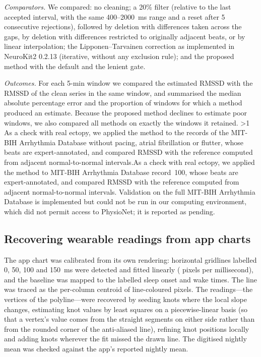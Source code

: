 \documentclass[11pt,a4paper]{article}
\begin{document}
\textit{Comparators.} We compared: no cleaning; a 20\% filter (relative to the last accepted interval, with the same 400--2000~ms range and a reset after 5 consecutive rejections), followed by deletion with differences taken across the gaps, by deletion with differences restricted to originally adjacent beats, or by linear interpolation; the Lipponen--Tarvainen correction as implemented in NeuroKit2 0.2.13 (iterative, without any exclusion rule);\autocite{makowski2021,lipponen2019} and the proposed method with the default and the lenient gate.

\textit{Outcomes.} For each 5-min window we compared the estimated RMSSD with the RMSSD of the clean series in the same window, and summarised the median absolute percentage error and the proportion of windows for which a method produced an estimate. Because the proposed method declines to estimate poor windows, we also compared all methods on exactly the windows it retained. \ifnum\mitRecords>1 As a check with real ectopy, we applied the method to the \mitRecords{} records of the MIT-BIH Arrhythmia Database without pacing, atrial fibrillation or flutter, whose beats are expert-annotated,\autocite{moody2001,goldberger2000} and compared RMSSD with the reference computed from adjacent normal-to-normal intervals.\else As a check with real ectopy, we applied the method to MIT-BIH Arrhythmia Database record~100, whose beats are expert-annotated,\autocite{moody2001,goldberger2000} and compared RMSSD with the reference computed from adjacent normal-to-normal intervals. Validation on the full MIT-BIH Arrhythmia Database is implemented but could not be run in our computing environment, which did not permit access to PhysioNet; it is reported as pending.\fi

\subsection{Recovering wearable readings from app charts}
The app chart was calibrated from its own rendering: horizontal gridlines labelled 0, 50, 100 and 150~ms were detected and fitted linearly (\pxPerMs{} pixels per millisecond), and the baseline was mapped to the labelled sleep onset and wake times. The line was traced as the per-column centroid of line-coloured pixels. The readings---the vertices of the polyline---were recovered by seeding knots where the local slope changes, estimating knot values by least squares on a piecewise-linear basis (so that a vertex's value comes from the straight segments on either side rather than from the rounded corner of the anti-aliased line), refining knot positions locally and adding knots wherever the fit missed the drawn line. The digitised nightly mean was checked against the app's reported nightly mean.
\end{document}

